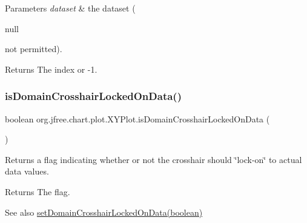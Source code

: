 \begin{DoxyParams}{Parameters}
{\em dataset} & the dataset (
\begin{DoxyCode}
null 
\end{DoxyCode}
 not permitted).\\
\hline
\end{DoxyParams}
\begin{DoxyReturn}{Returns}
The index or -\/1. 
\end{DoxyReturn}
\mbox{\label{classorg_1_1jfree_1_1chart_1_1plot_1_1_x_y_plot_adaa769a4f03f93f815c6f0be6f9d9435}} 
\subsubsection{\texorpdfstring{is\+Domain\+Crosshair\+Locked\+On\+Data()}{isDomainCrosshairLockedOnData()}}
{\footnotesize\ttfamily boolean org.\+jfree.\+chart.\+plot.\+X\+Y\+Plot.\+is\+Domain\+Crosshair\+Locked\+On\+Data (\begin{DoxyParamCaption}{ }\end{DoxyParamCaption})}

Returns a flag indicating whether or not the crosshair should \char`\"{}lock-\/on\char`\"{} to actual data values.

\begin{DoxyReturn}{Returns}
The flag.
\end{DoxyReturn}
\begin{DoxySeeAlso}{See also}
\mbox{\hyperlink{classorg_1_1jfree_1_1chart_1_1plot_1_1_x_y_plot_a969571f89d0c1776fdb612c0f3fc4e97}{set\+Domain\+Crosshair\+Locked\+On\+Data(boolean)}} 
\end{DoxySeeAlso}
\mbox{\label{classorg_1_1jfree_1_1chart_1_1plot_1_1_x_y_plot_ae1fc992f5b9f115943993c300b669c8d}} 
